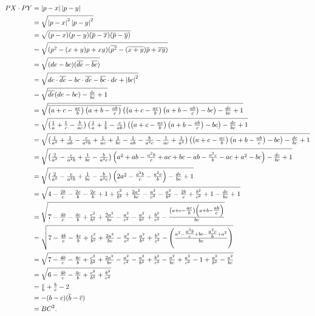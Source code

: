 \documentclass{article}
\begin{document}
{\allowdisplaybreaks
\begin{align*}
PX\cdot PY &= \left\lvert p-x \right\rvert\left\lvert p-y \right\rvert \\
&= \sqrt{\left\lvert p-x \right\rvert^2\left\lvert p-y \right\rvert^2} \\
&= \sqrt{(p-x)(p-y)(\overline{p}-\overline{x})(\overline{p}-\overline{y})} \\
&= \sqrt{(p^2-(x+y)p+xy)(\overline{p^2}-(\overline{x+y})\overline{p}+\overline{xy})} \\
&= \sqrt{(de-bc)(\overline{de}-\overline{bc})} \\
&= \sqrt{de\cdot\overline{de}-bc\cdot\overline{de}-\overline{bc}\cdot de+\left\lvert bc \right\rvert^2} \\
&= \sqrt{\overline{de}(de-bc)-\tfrac{de}{bc}+1} \\
&= \sqrt{\overline{\left(a+c-\tfrac{ac}{b}\right)\left(a+b-\tfrac{ab}{c}\right)}\left(\left(a+c-\tfrac{ac}{b}\right)\left(a+b-\tfrac{ab}{c}\right)-bc\right)-\tfrac{de}{bc}+1} \\
&= \sqrt{\left(\tfrac{1}{a}+\tfrac{1}{c}-\tfrac{b}{ac}\right)\left(\tfrac{1}{a}+\tfrac{1}{b}-\tfrac{c}{ab}\right)\left(\left(a+c-\tfrac{ac}{b}\right)\left(a+b-\tfrac{ab}{c}\right)-bc\right)-\tfrac{de}{bc}+1} \\
&= \sqrt{\left(\tfrac{1}{a^2}+\tfrac{1}{ab}-\tfrac{c}{a^2b}+\tfrac{1}{ac}+\tfrac{1}{bc}-\tfrac{1}{ab}-\tfrac{b}{a^2c}-\tfrac{1}{ac}+\tfrac{1}{a^2}\right)\left(\left(a+c-\tfrac{ac}{b}\right)\left(a+b-\tfrac{ab}{c}\right)-bc\right)-\tfrac{de}{bc}+1} \\
&= \sqrt{\left(\tfrac{2}{a^2}-\tfrac{c}{a^2b}+\tfrac{1}{bc}-\tfrac{b}{a^2c}\right)\left(a^2+ab-\tfrac{a^2b}{c}+ac+bc-ab-\tfrac{a^2c}{b}-ac+a^2-bc\right)-\tfrac{de}{bc}+1} \\
&= \sqrt{\left(\tfrac{2}{a^2}-\tfrac{c}{a^2b}+\tfrac{1}{bc}-\tfrac{b}{a^2c}\right)\left(2a^2-\tfrac{a^2b}{c}-\tfrac{a^2c}{b}\right)-\tfrac{de}{bc}+1} \\
&= \sqrt{4-\tfrac{2b}{c}-\tfrac{2c}{b}-\tfrac{2c}{b}+1+\tfrac{c^2}{b^2}+\tfrac{2a^2}{bc}-\tfrac{a^2}{c^2}-\tfrac{a^2}{b^2}-\tfrac{2b}{c}+\tfrac{b^2}{c^2}+1-\tfrac{de}{bc}+1} \\
&= \sqrt{7-\tfrac{4b}{c}-\tfrac{4c}{b}+\tfrac{c^2}{b^2}+\tfrac{2a^2}{bc}-\tfrac{a^2}{c^2}-\tfrac{a^2}{b^2}+\tfrac{b^2}{c^2}-\tfrac{\left(a+c-\tfrac{ac}{b}\right)\left(a+b-\tfrac{ab}{c}\right)}{bc}} \\
&= \sqrt{7-\tfrac{4b}{c}-\tfrac{4c}{b}+\tfrac{c^2}{b^2}+\tfrac{2a^2}{bc}-\tfrac{a^2}{c^2}-\tfrac{a^2}{b^2}+\tfrac{b^2}{c^2}-\left(\tfrac{a^2-\tfrac{a^2b}{c}+bc-\tfrac{a^2c}{b}+a^2}{bc}\right)} \\
&= \sqrt{7-\tfrac{4b}{c}-\tfrac{4c}{b}+\tfrac{c^2}{b^2}+\tfrac{2a^2}{bc}-\tfrac{a^2}{c^2}-\tfrac{a^2}{b^2}+\tfrac{b^2}{c^2}-\tfrac{a^2}{bc}+\tfrac{a^2}{c^2}-1+\tfrac{a^2}{b^2}-\tfrac{a^2}{bc}} \\
&= \sqrt{6-\tfrac{4b}{c}-\tfrac{4c}{b}+\tfrac{c^2}{b^2}+\tfrac{b^2}{c^2}} \\
&= \tfrac{c}{b}+\tfrac{b}{c}-2 \\
&= -(b-c)(\overline{b}-\overline{c}) \\
&= BC^2.
\end{align*}
}
\end{document}
